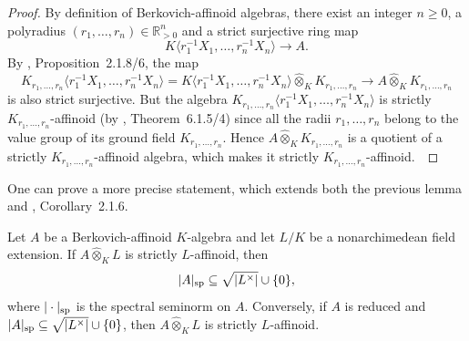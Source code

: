 \begin{proof}By definition of Berkovich-affinoid algebras, there exist an integer $n\geq0$, a polyradius $(r_1,\dots, r_n)\in \mathbb{R}_{>0}^{n}$ and a strict surjective ring map \begin{equation*}K\langle r_{1}^{-1}X_1,\dots, r_{n}^{-1}X_n\rangle \to A.\end{equation*}By \cite{BGR}, Proposition~2.1.8/6, the map \begin{equation*}K_{r_1,\dots, r_n}\langle r_{1}^{-1}X_{1},\dots, r_{n}^{-1}X_{n}\rangle=K\langle r_{1}^{-1}X_1,\dots, r_{n}^{-1}X_n\rangle\widehat{\otimes}_{K}K_{r_1,\dots, r_n}\to A\widehat{\otimes}_{K}K_{r_1,\dots, r_n}\end{equation*}is also strict surjective. But the algebra $K_{r_1,\dots, r_n}\langle r_{1}^{-1}X_{1},\dots, r_{n}^{-1}X_{n}\rangle$ is strictly $K_{r_1,\dots, r_n}$-affinoid (by \cite{BGR}, Theorem~6.1.5/4) since all the radii $r_1,\dots, r_n$ belong to the value group of its ground field $K_{r_1,\dots, r_n}$. Hence $A\widehat{\otimes}_{K}K_{r_1,\dots, r_n}$ is a quotient of a strictly $K_{r_1,\dots, r_n}$-affinoid algebra, which makes it strictly $K_{r_1,\dots, r_n}$-affinoid. \end{proof}
One can prove a more precise statement, which extends both the previous lemma and \cite{Berkovich}, Corollary~2.1.6. 
\begin{lemma}\label{Strictly affinoid 2}Let $A$ be a Berkovich-affinoid $K$-algebra and let $L/K$ be a nonarchimedean field extension. If $A\widehat{\otimes}_{K}L$ is strictly $L$-affinoid, then \begin{equation*}\vert A\vert_{\mathrm{sp}}\subseteq \sqrt{\vert L^{\times}\vert}\cup\{0\},\end{equation*}where $\vert\cdot\vert_{\mathrm{sp}}$ is the spectral seminorm on $A$. Conversely, if $A$ is reduced and $\vert A\vert_{\mathrm{sp}}\subseteq \sqrt{\vert L^{\times}\vert}\cup\{0\}$, then $A\widehat{\otimes}_{K}L$ is strictly $L$-affinoid.\end{lemma}
